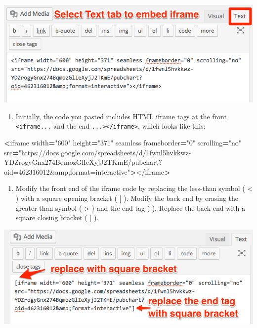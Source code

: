 \documentclass[
  english,
]{book}
\newenvironment{Shaded}{\begin{snugshade}}{\end{snugshade}}
\newcommand{\NormalTok}[1]{#1}
\newcommand{\OperatorTok}[1]{\textcolor[rgb]{0.81,0.36,0.00}{\textbf{#1}}}
\newcommand{\StringTok}[1]{\textcolor[rgb]{0.31,0.60,0.02}{#1}}
\providecommand{\tightlist}{%
  \setlength{\itemsep}{0pt}\setlength{\parskip}{0pt}}
\begin{document}
\includegraphics{images/07-embed/WordPressOrg-text-tab-paste-iframe.png}

\begin{enumerate}
\def\labelenumi{\arabic{enumi})}
\setcounter{enumi}{6}
\tightlist
\item
  Initially, the code you pasted includes HTML iframe tags at the front \texttt{\textless{}iframe...} and the end \texttt{...\textgreater{}\textless{}/iframe\textgreater{}}, which looks like this:
\end{enumerate}

\begin{Shaded}
\begin{Highlighting}[]
\OperatorTok{<}\NormalTok{iframe width}\OperatorTok{=}\StringTok{"600"}\NormalTok{ height}\OperatorTok{=}\StringTok{"371"}\NormalTok{ seamless frameborder}\OperatorTok{=}\StringTok{"0"}\NormalTok{ scrolling}\OperatorTok{=}\StringTok{"no"}\NormalTok{ src}\OperatorTok{=}\StringTok{"https://docs.google.com/spreadsheets/d/1fwnl5hvkkwz{-}YDZrogyGnx274BqmozGlIeXyjJ2TKmE/pubchart?oid=462316012\&amp;format=interactive"}\OperatorTok{>}\NormalTok{</iframe}\OperatorTok{>}
\end{Highlighting}
\end{Shaded}

\begin{enumerate}
\def\labelenumi{\arabic{enumi})}
\setcounter{enumi}{7}
\tightlist
\item
  Modify the front end of the iframe code by replacing the less-than symbol ( \textless{} ) with a square opening bracket ( {[} ). Modify the back end by erasing the greater-than symbol ( \textgreater{} ) and the end tag ( ). Replace the back end with a square closing bracket ( {]} ).
\end{enumerate}

\includegraphics{images/07-embed/WordPressOrg-replace-with-bracket.png}
\end{document}
